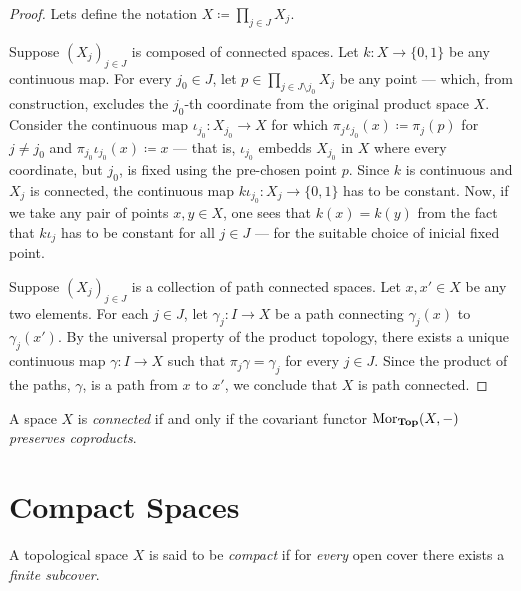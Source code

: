 \begin{proof}
Lets define the notation \(X \coloneq \prod_{j \in J} X_j\).

Suppose \((X_j)_{j \in J}\) is composed of connected spaces. Let
\(k: X \to \{0, 1\}\) be any continuous map. For every \(j_0 \in J\), let
\(p \in \prod_{j \in J \setminus j_0} X_j\) be any point --- which, from
construction, excludes the \(j_0\)-th coordinate from the original product space
\(X\). Consider the continuous map \(\iota_{j_0}: X_{j_0} \to X\) for which
\(\pi_j \iota_{j_0}(x) \coloneq \pi_j(p)\) for \(j \neq j_0\) and
\(\pi_{j_0}\iota_{j_0}(x) \coloneq x\) --- that is, \(\iota_{j_0}\) embedds
\(X_{j_0}\) in \(X\) where every coordinate, but \(j_0\), is fixed using the
pre-chosen point \(p\). Since \(k\) is continuous and \(X_j\) is connected, the
continuous map \(k \iota_{j_0}: X_j \to \{0, 1\}\) has to be constant. Now, if
we take any pair of points \(x, y \in X\), one sees that \(k(x) = k(y)\) from
the fact that \(k \iota_j\) has to be constant for all \(j \in J\) --- for the
suitable choice of inicial fixed point.

Suppose \((X_j)_{j \in J}\) is a collection of path connected spaces. Let
\(x, x' \in X\) be any two elements. For each \(j \in J\), let
\(\gamma_j: I \to X\) be a path connecting \(\gamma_j(x)\) to
\(\gamma_j(x')\). By the universal property of the product topology, there
exists a unique continuous map \(\gamma: I \to X\) such that
\(\pi_j \gamma = \gamma_j\) for every \(j \in J\). Since the product of the
paths, \(\gamma\), is a path from \(x\) to \(x'\), we conclude that \(X\) is
path connected.
\end{proof}

\begin{theorem}
\label{thm:connected-iff-cov-preserves-coprod}
A space \(X\) is \emph{connected} if and only if the covariant functor
\(\operatorname{Mor}_{{\textbf{Top}}}(X, -)\) \emph{preserves coproducts}.
\end{theorem}

\section{Compact Spaces}

\begin{definition}
\label{def:compact-space}
A topological space \(X\) is said to be \emph{compact} if for \emph{every} open
cover there exists a \emph{finite subcover}.
\end{definition}

